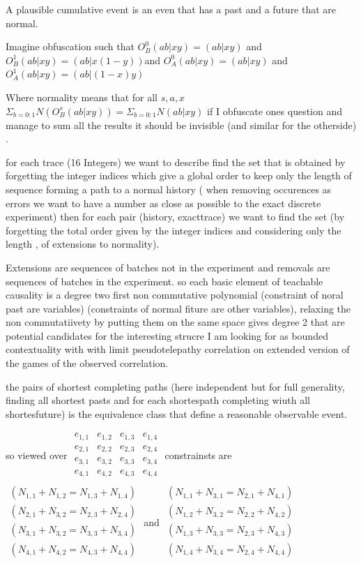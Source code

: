 \documentclass{article}
\begin{document}
A plausible cumulative  event is an even that has a past and a future that are normal.

Imagine obfuscation such that $O_B^0 (ab|xy)=(ab|xy)$ and $O_B^1 (ab|xy)=(ab|x(1-y))$and $O_A^0 (ab|xy)=(ab|xy)$ and $O_A^1 (ab|xy)=(ab|(1-x)y)$

Where normality means that for all $s,a,x$  $\Sigma_{b=0:1} N(O_B^s (ab|xy))=\Sigma_{b=0:1} N(ab|xy)$ if I obfuscate ones question and manage to sum all the results it should be invisible (and similar for the otherside) .

for each trace (16 Integers) we want to describe  find the set that is obtained  by forgetting the integer indices which give a global order to keep only the length of  sequence forming a path to a normal history ( when removing occurences as errors we want to have a number as close as possible to the exact discrete experiment) then for each pair (history, exacttrace)  we want to find the set (by forgetting the total order given by the integer indices and considering only the length , of extensions to normality).

Extensions are sequences of batches not in the experiment and removals are sequences of batches in the experiment.
so each basic element of  teachable causality is a degree two first non commutative polynomial  (constraint of noral past are variables) (constraints of normal fiture are other variables), relaxing the non commutatiivety by putting them on the same space gives degree 2 that are potential candidates for the interesting strucre I am looking for as bounded contextuality with with limit pseudotelepathy correlation on extended version of the games of the observed correlation.
 
  
the pairs of shortest completing paths (here independent but for full generality, finding all shortest pasts and for each shortespath completing wiuth all shortesfuture) is the equivalence class that define a reasonable observable event.

so viewed over 
$\begin{matrix}
e_{1,1}&e_{1,2}&e_{1,3}&e_{1,4}\\
e_{2,1}&e_{2,2}&e_{2,3}&e_{2,4}\\
e_{3,1}&e_{3,2}&e_{3,3}&e_{3,4}\\
e_{4,1}&e_{4,2}&e_{4,3}&e_{4,4}\\
\end{matrix}$ constrainsts are 
$\begin{matrix}
(N_{1,1}+N_{1,2}=N_{1,3}+N_{1,4})\\
(N_{2,1}+N_{3,2}=N_{2,3}+N_{2,4})\\
(N_{3,1}+N_{3,2}=N_{3,3}+N_{3,4})\\
(N_{4,1}+N_{4,2}=N_{4,3}+N_{4,4})\\
\end{matrix}$ and $\begin{matrix}
(N_{1,1}+N_{3,1}=N_{2,1}+N_{4,1})\\
(N_{1,2}+N_{3,2}=N_{2,2}+N_{4,2})\\
(N_{1,3}+N_{3,3}=N_{2,3}+N_{4,3})\\
(N_{1,4}+N_{3,4}=N_{2,4}+N_{4,4})\\
\end{matrix}$ 
\end{document}
